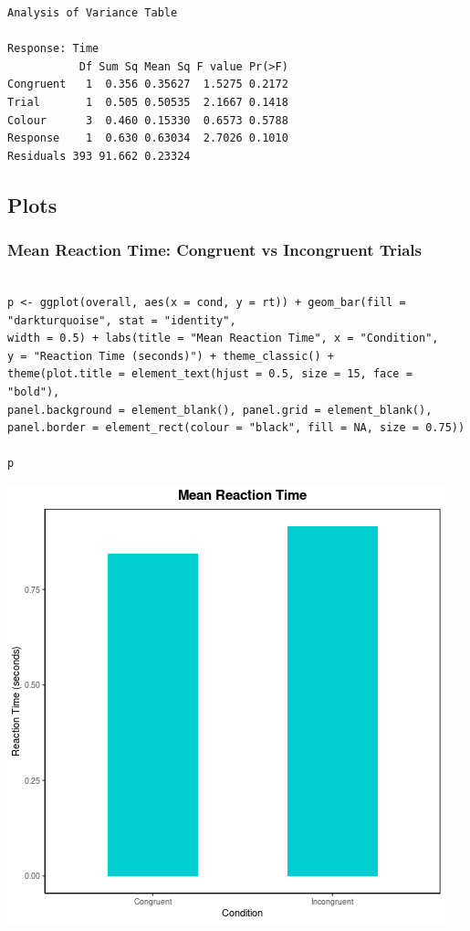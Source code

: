 \documentclass{article}
\begin{document}
\begin{verbatim}
Analysis of Variance Table

Response: Time
           Df Sum Sq Mean Sq F value Pr(>F)
Congruent   1  0.356 0.35627  1.5275 0.2172
Trial       1  0.505 0.50535  2.1667 0.1418
Colour      3  0.460 0.15330  0.6573 0.5788
Response    1  0.630 0.63034  2.7026 0.1010
Residuals 393 91.662 0.23324
\end{verbatim}

\subsection{Plots}
\label{sec:org392119a}
\subsubsection{Mean Reaction Time: Congruent vs Incongruent Trials}
\label{sec:orge3d03ca}
\begin{verbatim}

p <- ggplot(overall, aes(x = cond, y = rt)) + geom_bar(fill = "darkturquoise", stat = "identity", 
width = 0.5) + labs(title = "Mean Reaction Time", x = "Condition", 
y = "Reaction Time (seconds)") + theme_classic() + 
theme(plot.title = element_text(hjust = 0.5, size = 15, face = "bold"), 
panel.background = element_blank(), panel.grid = element_blank(), 
panel.border = element_rect(colour = "black", fill = NA, size = 0.75))

p
\end{verbatim}

\begin{center}
\includegraphics[width=.9\linewidth]{converted_stroop2.png}
\end{center}
\end{document}
